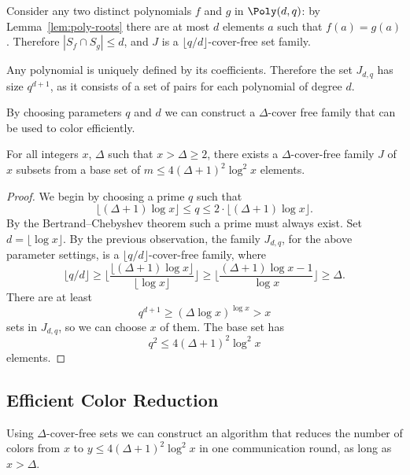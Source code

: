 Consider any two distinct polynomials $f$ and $g$ in $\Poly(d,q)$: by Lemma~\ref{lem:poly-roots} there are at most $d$ elements $a$ such that $f(a) = g(a)$. Therefore $|S_f \cap S_g| \leq d$, and $J$ is a $\lfloor q/d \rfloor$-cover-free set family.

Any polynomial is uniquely defined by its coefficients. Therefore the set $J_{d,q}$ has size $q^{d+1}$, as it consists of a set of pairs for each polynomial of degree $d$.

By choosing parameters $q$ and $d$ we can construct a $\Delta$-cover free family that can be used to color efficiently.

\begin{lemma} \label{lem:delta-cover-free}
  For all integers $x$, $\Delta$ such that $x > \Delta \geq 2$, there exists a $\Delta$-cover-free family $J$ of $x$ subsets from a base set of $m \leq 4(\Delta+1)^2 \log^2 x$ elements.
\end{lemma}

\begin{proof}
  We begin by choosing a prime $q$ such that
  \[
    \bigl\lfloor (\Delta+1)\log x \bigr\rfloor \leq q \leq 2 \cdot \bigl\lfloor (\Delta+1)\log x \bigr\rfloor.
  \]
  By the Bertrand--Chebyshev theorem such a prime must always exist. Set $d = \lfloor \log x \rfloor$. By the previous observation, the family $J_{d,q}$, for the above parameter settings, is a $\lfloor q / d \rfloor$-cover-free family, where 
  \[
    \lfloor q / d \rfloor \geq \biggl\lfloor \frac{\lfloor (\Delta+1)\log x \rfloor}{\lfloor \log x \rfloor} \biggr\rfloor \geq \biggl\lfloor \frac{(\Delta+1)\log x - 1}{\log x} \biggr\rfloor \geq \Delta.
  \]
  There are at least 
  \[
  q^{d+1} \geq (\Delta \log x)^{\log x } > x
  \]
  sets in $J_{d,q}$, so we can choose $x$ of them. The base set has \[q^2 \leq 4(\Delta+1)^2 \log^2 x\] elements.
\end{proof}

\subsection{Efficient Color Reduction} \label{ssec:efficient-cr}

Using $\Delta$-cover-free sets we can construct an algorithm that reduces the number of colors from $x$ to $y \leq 4(\Delta+1)^2 \log^2 x$ in one communication round, as long as $x > \Delta$.

